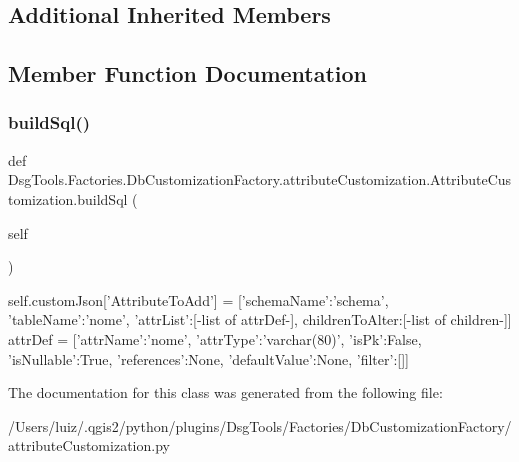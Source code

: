 \subsection*{Additional Inherited Members}


\subsection{Member Function Documentation}
\mbox{\label{class_dsg_tools_1_1_factories_1_1_db_customization_factory_1_1attribute_customization_1_1_attribute_customization_ab08ae1a29546b5a86e55ca956efd3f48}} 
\subsubsection{\texorpdfstring{build\+Sql()}{buildSql()}}
{\footnotesize\ttfamily def Dsg\+Tools.\+Factories.\+Db\+Customization\+Factory.\+attribute\+Customization.\+Attribute\+Customization.\+build\+Sql (\begin{DoxyParamCaption}\item[{}]{self }\end{DoxyParamCaption})}

\begin{DoxyVerb}self.customJson['AttributeToAdd'] = [{'schemaName':'schema', 'tableName':'nome', 'attrList':[-list of attrDef-], childrenToAlter:[-list of children-]}]
attrDef = [{'attrName':'nome', 'attrType':'varchar(80)', 'isPk':False, 'isNullable':True, 'references':None, 'defaultValue':None, 'filter':[]}]
\end{DoxyVerb}
 

The documentation for this class was generated from the following file\+:\begin{DoxyCompactItemize}
\item 
/\+Users/luiz/.\+qgis2/python/plugins/\+Dsg\+Tools/\+Factories/\+Db\+Customization\+Factory/attribute\+Customization.\+py\end{DoxyCompactItemize}
